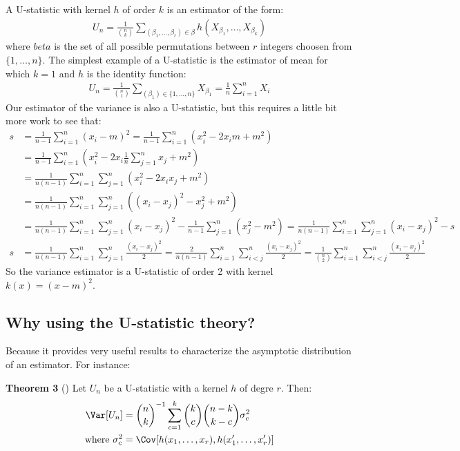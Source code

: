 \documentclass[12pt]{article}
\begin{document}
A U-statistic with kernel \(h\) of order \(k\) is an estimator of the
form:
\begin{align*}
U_n = \frac{1}{{n \choose k}} \sum_{(\beta_1,\ldots,\beta_r) \in \beta} h \left(X_{\beta_1},\ldots,X_{\beta_k} \right)
\end{align*}
where \(beta\) is the set of all possible permutations between \(r\)
integers choosen from \(\{1,\ldots,n\}\). The simplest example of a
U-statistic is the estimator of mean for which \(k=1\) and \(h\) is the identity
function:
\begin{align*}
U_n = \frac{1}{{n \choose 1}} \sum_{(\beta_1) \in \{1,\ldots,n\}} X_{\beta_1} = \frac{1}{n} \sum_{i=1}^{n} X_{i}
\end{align*}
Our estimator of the variance is also a U-statistic, but this requires
a little bit more work to see that:
\begin{align*}
s &= \frac{1}{n-1} \sum_{i=1}^n (x_i-m)^2 = \frac{1}{n-1} \sum_{i=1}^n \left(x_i^2 - 2 x_i m + m^2\right) \\
&=  \frac{1}{n-1} \sum_{i=1}^n \left(x_i^2 - 2 x_i \frac{1}{n} \sum_{j=1}^n x_j + m^2\right) \\
&=  \frac{1}{n(n-1)} \sum_{i=1}^n \sum_{j=1}^n \left( x_i^2 - 2 x_i  x_j + m^2 \right) \\
&=  \frac{1}{n(n-1)} \sum_{i=1}^n \sum_{j=1}^n \left( (x_i - x_j)^2 - x_j^2 + m^2 \right) \\
&=  \frac{1}{n(n-1)} \sum_{i=1}^n \sum_{j=1}^n (x_i - x_j)^2 - \frac{1}{n-1} \sum_{j=1}^n \left(x_j^2 - m^2\right)
=  \frac{1}{n(n-1)} \sum_{i=1}^n \sum_{j=1}^n (x_i - x_j)^2 - s \\
s &=  \frac{1}{n(n-1)} \sum_{i=1}^n \sum_{j=1}^n \frac{(x_i - x_j)^2}{2} 
=  \frac{2}{n(n-1)} \sum_{i=1}^n \sum_{i<j}^n \frac{(x_i - x_j)^2}{2}
=  \frac{1}{{n \choose 2}} \sum_{i=1}^n \sum_{i<j}^n \frac{(x_i - x_j)^2}{2} 
\end{align*}
So the variance estimator is a U-statistic of order 2 with kernel \(k(x)=(x-m)^2\).

\subsection{Why using the U-statistic theory?}
\label{sec:org69e55df}

Because it provides very useful results to characterize the asymptotic
distribution of an estimator. For instance:

\bigskip

\textbf{Theorem 3} (\cite{lee1990u}) Let \(U_n\) be a U-statistic with a kernel \(h\) of degre \(r\). Then:
\begin{align*}
\Var[U_n] &= {n \choose k}^{-1} \sum_{c=1}^k {k \choose c} {n-k \choose k-c} \sigma^2_c \\
\text{where } \sigma^2_c &= \Cov[h(x_1,\ldots,x_r),h(x'_1,\ldots,x'_r)]
\end{align*}

\bigskip


\clearpage
\end{document}
